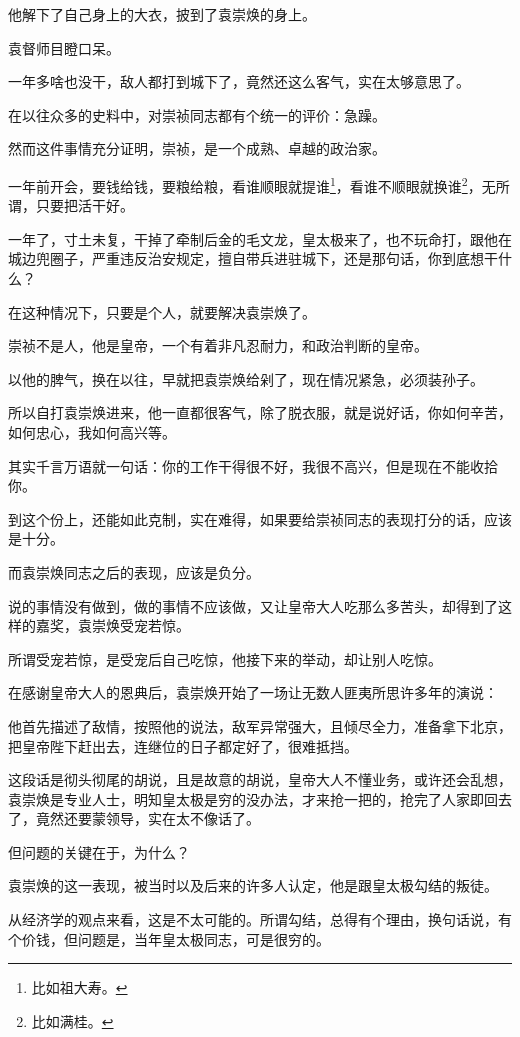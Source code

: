 \begin{multicols}{\theparacolNo}
他解下了自己身上的大衣，披到了袁崇焕的身上。

袁督师目瞪口呆。

一年多啥也没干，敌人都打到城下了，竟然还这么客气，实在太够意思了。

在以往众多的史料中，对崇祯同志都有个统一的评价：急躁。

然而这件事情充分证明，崇祯，是一个成熟、卓越的政治家。

一年前开会，要钱给钱，要粮给粮，看谁顺眼就提谁\footnote{比如祖大寿。}，看谁不顺眼就换谁\footnote{比如满桂。}，无所谓，只要把活干好。

一年了，寸土未复，干掉了牵制后金的毛文龙，皇太极来了，也不玩命打，跟他在城边兜圈子，严重违反治安规定，擅自带兵进驻城下，还是那句话，你到底想干什么？

在这种情况下，只要是个人，就要解决袁崇焕了。

崇祯不是人，他是皇帝，一个有着非凡忍耐力，和政治判断的皇帝。

以他的脾气，换在以往，早就把袁崇焕给剁了，现在情况紧急，必须装孙子。

所以自打袁崇焕进来，他一直都很客气，除了脱衣服，就是说好话，你如何辛苦，如何忠心，我如何高兴等。

其实千言万语就一句话：你的工作干得很不好，我很不高兴，但是现在不能收拾你。

到这个份上，还能如此克制，实在难得，如果要给崇祯同志的表现打分的话，应该是十分。

而袁崇焕同志之后的表现，应该是负分。

说的事情没有做到，做的事情不应该做，又让皇帝大人吃那么多苦头，却得到了这样的嘉奖，袁崇焕受宠若惊。

所谓受宠若惊，是受宠后自己吃惊，他接下来的举动，却让别人吃惊。

在感谢皇帝大人的恩典后，袁崇焕开始了一场让无数人匪夷所思许多年的演说：

他首先描述了敌情，按照他的说法，敌军异常强大，且倾尽全力，准备拿下北京，把皇帝陛下赶出去，连继位的日子都定好了，很难抵挡。

这段话是彻头彻尾的胡说，且是故意的胡说，皇帝大人不懂业务，或许还会乱想，袁崇焕是专业人士，明知皇太极是穷的没办法，才来抢一把的，抢完了人家即回去了，竟然还要蒙领导，实在太不像话了。

但问题的关键在于，为什么？

袁崇焕的这一表现，被当时以及后来的许多人认定，他是跟皇太极勾结的叛徒。

从经济学的观点来看，这是不太可能的。所谓勾结，总得有个理由，换句话说，有个价钱，但问题是，当年皇太极同志，可是很穷的。


\end{multicols}
